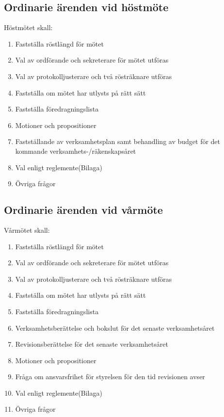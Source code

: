 \documentclass[a4paper]{article}
\begin{document}
{{  \subsection{Ordinarie ärenden vid höstmöte}
  Höstmötet skall:
  \begin{enumerate}
  \item Fastställa röstlängd för mötet
  \item Val av ordförande och sekreterare för mötet utföras
  \item Val av protokolljusterare och två rösträknare utföras
  \item Fastställa om mötet har utlysts på rätt sätt
  \item Fastställa föredragningslista
  \item Motioner och propositioner
  \item Fastställande av verksamhetsplan samt behandling av budget för det kommande verksamhets-/räkenskapsåret
  \item Val enligt reglemente(Bilaga)
  \item Övriga frågor
  \end{enumerate}
  \subsection{Ordinarie ärenden vid vårmöte}
  Vårmötet skall:
  \begin{enumerate}
  \item Fastställa röstlängd för mötet
  \item Val av ordförande och sekreterare för mötet utföras
  \item Val av protokolljusterare och två rösträknare utföras
  \item Fastställa om mötet har utlysts på rätt sätt
  \item Fastställa föredragningslista
  \item Verksamhetsberättelse och bokslut för det senaste verksamhetsåret
  \item Revisionsberättelse för det senaste verksamhetsåret
  \item Motioner och propositioner
  \item Fråga om ansvarsfrihet för styrelsen för den tid revisionen avser
  \item Val enligt reglemente(Bilaga)
  \item Övriga frågor
  \end{enumerate}
}}
\end{document}
